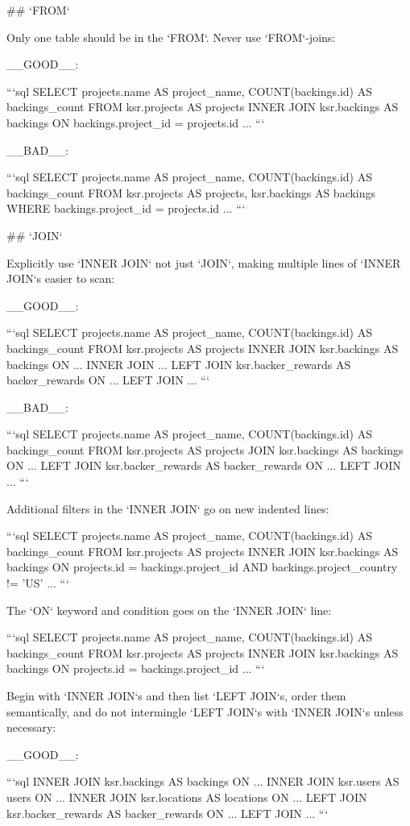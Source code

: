 ## `FROM`

Only one table should be in the `FROM`. Never use `FROM`-joins:

__GOOD__:

```sql
SELECT
  projects.name AS project_name,
  COUNT(backings.id) AS backings_count
FROM ksr.projects AS projects
INNER JOIN ksr.backings AS backings ON backings.project_id = projects.id
...
```

__BAD__:

```sql
SELECT
  projects.name AS project_name,
  COUNT(backings.id) AS backings_count
FROM ksr.projects AS projects, ksr.backings AS backings
WHERE
  backings.project_id = projects.id
...
```

## `JOIN`

Explicitly use `INNER JOIN` not just `JOIN`, making multiple lines of `INNER JOIN`s easier to scan:

__GOOD__:

```sql
SELECT
  projects.name AS project_name,
  COUNT(backings.id) AS backings_count
FROM ksr.projects AS projects
INNER JOIN ksr.backings AS backings ON ...
INNER JOIN ...
LEFT JOIN ksr.backer_rewards AS backer_rewards ON ...
LEFT JOIN ...
```

__BAD__:

```sql
SELECT
  projects.name AS project_name,
  COUNT(backings.id) AS backings_count
FROM ksr.projects AS projects
JOIN ksr.backings AS backings ON ...
LEFT JOIN ksr.backer_rewards AS backer_rewards ON ...
LEFT JOIN ...
```

Additional filters in the `INNER JOIN` go on new indented lines:

```sql
SELECT
  projects.name AS project_name,
  COUNT(backings.id) AS backings_count
FROM ksr.projects AS projects
INNER JOIN ksr.backings AS backings ON projects.id = backings.project_id
  AND backings.project_country != 'US'
...
```

The `ON` keyword and condition goes on the `INNER JOIN` line:

```sql
SELECT
  projects.name AS project_name,
  COUNT(backings.id) AS backings_count
FROM ksr.projects AS projects
INNER JOIN ksr.backings AS backings ON projects.id = backings.project_id
...
```

Begin with `INNER JOIN`s and then list `LEFT JOIN`s, order them semantically, and do not intermingle `LEFT JOIN`s with `INNER JOIN`s unless necessary:

__GOOD__:

```sql
INNER JOIN ksr.backings AS backings ON ...
INNER JOIN ksr.users AS users ON ...
INNER JOIN ksr.locations AS locations ON ...
LEFT JOIN ksr.backer_rewards AS backer_rewards ON ...
LEFT JOIN ...
```

